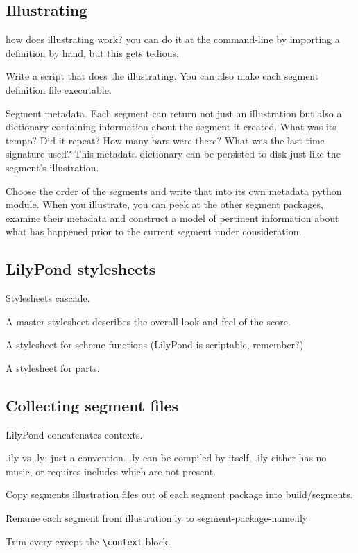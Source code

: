 \subsection{Illustrating}

how does illustrating work? you can do it at the command-line by importing a
definition by hand, but this gets tedious.

Write a script that does the illustrating. You can also make each segment
definition file executable.

Segment metadata. Each segment can return not just an illustration but also a
dictionary containing information about the segment it created. What was its
tempo? Did it repeat? How many bars were there? What was the last time
signature used? This metadata dictionary can be persisted to disk just like the
segment's illustration.

Choose the order of the segments and write that into its own metadata python
module. When you illustrate, you can peek at the other segment packages,
examine their metadata and construct a model of pertinent information about
what has happened prior to the current segment under consideration.

\subsection{LilyPond stylesheets}

Stylesheets cascade.

A master stylesheet describes the overall look-and-feel of the score.

A stylesheet for scheme functions (LilyPond is scriptable, remember?)

A stylesheet for parts.

\subsection{Collecting segment files}

LilyPond concatenates contexts.

.ily vs .ly: just a convention. .ly can be compiled by itself, .ily either has
no music, or requires includes which are not present.

Copy segments illustration files out of each segment package into
build/segments.

Rename each segment from illustration.ly to segment-package-name.ily

Trim every except the \texttt{\textbackslash{}context} block.

